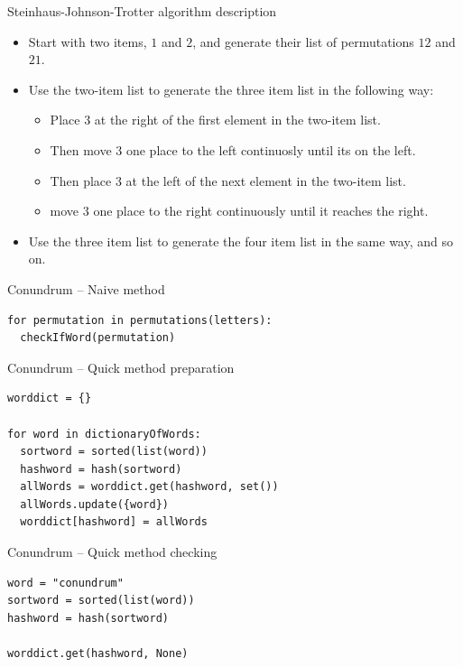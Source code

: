 \begin{frame}[fragile]{Steinhaus-Johnson-Trotter algorithm description}
	\begin{itemize}
		\item Start with two items, $1$ and $2$, and generate their list of permutations $12$ and $21$.
		\item Use the two-item list to generate the three item list in the following way:
		\begin{itemize}
			\item Place $3$ at the right of the first element in the two-item list.
			\item Then move $3$ one place to the left continuosly until its on the left.
			\item Then place $3$ at the left of the next element in the two-item list.
			\item move $3$ one place to the right continuously until it reaches the right.
		\end{itemize}
		\item Use the three item list to generate the four item list in the same way, and so on.
	\end{itemize}
\end{frame}

\begin{frame}[fragile]{Conundrum -- Naive method}
	\begin{verbatim}
for permutation in permutations(letters):
  checkIfWord(permutation)
  \end{verbatim}
\end{frame}

\begin{frame}[fragile]{Conundrum -- Quick method preparation}
	\begin{verbatim}
worddict = {}

for word in dictionaryOfWords:
  sortword = sorted(list(word))
  hashword = hash(sortword)
  allWords = worddict.get(hashword, set())
  allWords.update({word})
  worddict[hashword] = allWords
  \end{verbatim}
\end{frame}

\begin{frame}[fragile]{Conundrum -- Quick method checking}
	\begin{verbatim}
word = "conundrum"
sortword = sorted(list(word))
hashword = hash(sortword)

worddict.get(hashword, None)
  \end{verbatim}
\end{frame}


